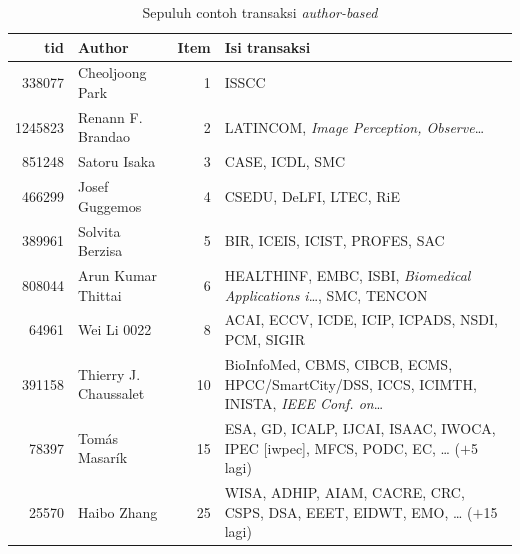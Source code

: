 \begin{table}[!htb]
\caption{Sepuluh contoh transaksi \textit{author-based}}
\label{tab:contoh-a}
\footnotesize
\begin{tabularx}{\textwidth}{@{}rlrX@{}}
\toprule
\textbf{tid} & \textbf{Author} & \textbf{Item} & \textbf{Isi transaksi} \\
\midrule
338077 & Cheoljoong Park & 1 & ISSCC \\
1245823 & Renann F. Brandao & 2 & LATINCOM, \textit{Image Perception, Observe}\ldots \\
851248 & Satoru Isaka & 3 & CASE, ICDL, SMC \\
466299 & Josef Guggemos & 4 & CSEDU, DeLFI, LTEC, RiE \\
389961 & Solvita Berzisa & 5 & BIR, ICEIS, ICIST, PROFES, SAC \\
808044 & Arun Kumar Thittai & 6 & HEALTHINF, EMBC, ISBI, \textit{Biomedical Applications i}\ldots, SMC, TENCON \\
64961 & Wei Li 0022 & 8 & ACAI, ECCV, ICDE, ICIP, ICPADS, NSDI, PCM, SIGIR \\
391158 & Thierry J. Chaussalet & 10 & BioInfoMed, CBMS, CIBCB, ECMS, HPCC/SmartCity/DSS, ICCS, ICIMTH, INISTA, \textit{IEEE Conf. on}\ldots \\
78397 & Tomás Masarík & 15 & ESA, GD, ICALP, IJCAI, ISAAC, IWOCA, IPEC [iwpec], MFCS, PODC, EC, \ldots{} ($+$5 lagi) \\
25570 & Haibo Zhang & 25 & WISA, ADHIP, AIAM, CACRE, CRC, CSPS, DSA, EEET, EIDWT, EMO, \ldots{} ($+$15 lagi) \\
\bottomrule
\end{tabularx}
\end{table}

